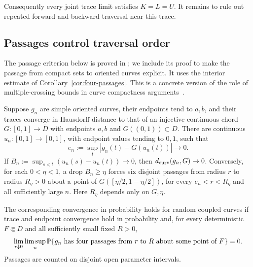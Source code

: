 Consequently every joint trace limit satisfies $K=L=U$.  It remains
to rule out repeated forward and backward traversal near this trace.

\subsection{Passages control traversal order}

The passage criterion below is proved in
\cite[Section~7, Lemma ``Progress coordinates and the full curve
metric'']{S}; we include its proof to make the passage from compact
sets to oriented curves explicit.  It uses the interior estimate
of Corollary~\ref{cor:four-passages}.  This is a concrete version
of the role of multiple-crossing bounds in curve compactness
arguments~\cite{AB,KS}.

\begin{lemma}
\label{lem:progress}
Suppose $g_n$ are simple oriented curves, their endpoints tend to
$a,b$, and their traces converge in Hausdorff distance to that of
an injective continuous chord $G:[0,1]\to\overline D$ with endpoints
$a,b$ and $G((0,1))\subset D$.  There are continuous
$u_n:[0,1]\to[0,1]$, with endpoint values tending to $0,1$, such that
\[
 e_n:=\sup_t|g_n(t)-G(u_n(t))|\longrightarrow0.
\]
If $B_n:=\sup_{s<t}(u_n(s)-u_n(t))\to0$, then
$d_{\rm curv}(g_n,G)\to0$.  Conversely, for each $0<\eta<1$,
a drop $B_n\ge\eta$ forces six disjoint passages from radius $r$
to radius $R_\eta>0$ about a point of
$G([\eta/2,1-\eta/2])$, for every $e_n<r<R_\eta$ and all
sufficiently large $n$.  Here $R_\eta$ depends only on $G,\eta$.

The corresponding convergence in probability holds for random
coupled curves if trace and endpoint convergence hold in probability
and, for every deterministic $F\Subset D$ and all sufficiently small
fixed $R>0$,
\begin{equation}
 \lim_{r\downarrow0}\limsup_n
 \mathbb P\{g_n\text{ has four passages from }r\text{ to }R
                     \text{ about some point of }F\}=0.
 \label{eq:progress-passage}
\end{equation}
Passages are counted on disjoint open parameter intervals.
\end{lemma}

